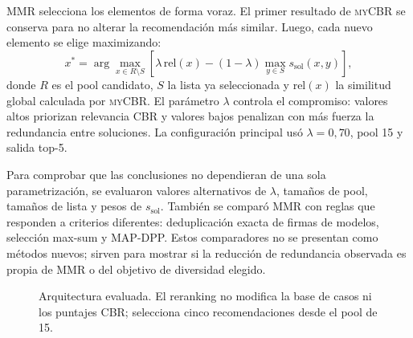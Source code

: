 \documentclass[11pt,a4paper]{article}
\newcommand{\OPMAD}{\textsc{opmad}}
\newcommand{\OntoCast}{\textsc{OntoCast}}
\newcommand{\myCBR}{\textsc{myCBR}}
\begin{document}
MMR selecciona los elementos de forma voraz. El primer resultado de \myCBR{} se conserva para no alterar la recomendación más similar. Luego, cada nuevo elemento se elige maximizando:
\begin{equation}
 x^{*}=\arg\max_{x\in R\setminus S}\left[\lambda\,\mathrm{rel}(x)-(1-\lambda)\max_{y\in S}s_{\mathrm{sol}}(x,y)\right],
 \label{eq:mmr}
\end{equation}
donde $R$ es el pool candidato, $S$ la lista ya seleccionada y $\mathrm{rel}(x)$ la similitud global calculada por \myCBR{}. El parámetro $\lambda$ controla el compromiso: valores altos priorizan relevancia CBR y valores bajos penalizan con más fuerza la redundancia entre soluciones. La configuración principal usó $\lambda=0{,}70$, pool 15 y salida top-5.

Para comprobar que las conclusiones no dependieran de una sola parametrización, se evaluaron valores alternativos de $\lambda$, tamaños de pool, tamaños de lista y pesos de $s_{\mathrm{sol}}$. También se comparó MMR con reglas que responden a criterios diferentes: deduplicación exacta de firmas de modelos, selección max-sum y MAP-DPP. Estos comparadores no se presentan como métodos nuevos; sirven para mostrar si la reducción de redundancia observada es propia de MMR o del objetivo de diversidad elegido.

\begin{figure}[H]
\centering
{}
\caption{Arquitectura evaluada. El reranking no modifica la base de casos ni los puntajes CBR; selecciona cinco recomendaciones desde el pool de 15.}
\label{fig:architecture}
\end{figure}
\end{document}
